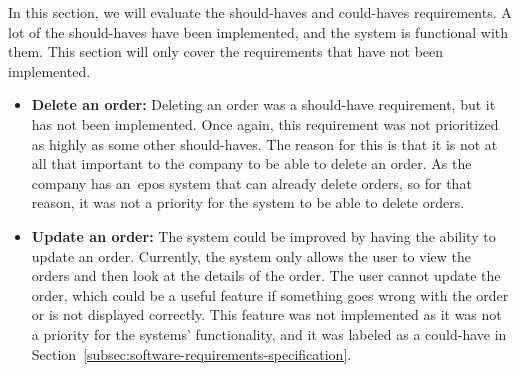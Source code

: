 In this section, we will evaluate the should-haves and could-haves requirements.
A lot of the should-haves have been implemented, and the system is functional with them.
This section will only cover the requirements that have not been implemented.

\begin{itemize}
    \item \textbf{Delete an order:}
    Deleting an order was a should-have requirement, but it has not been implemented.
    Once again, this requirement was not prioritized as highly as some other should-haves.
    The reason for this is that it is not at all that important to the company to be able to delete an order.
    As the company has an~\acrshort{epos} system that can already delete orders, so for that reason, it was not a priority
    for the system to be able to delete orders.
    \item \textbf{Update an order:}
    The system could be improved by having the ability to update an order.
    Currently, the system only allows the user to view the orders and then look at the details of the order.
    The user cannot update the order, which could be a useful feature if something goes wrong with the order or is not
    displayed correctly.
    This feature was not implemented as it was not a priority for the systems' functionality, and it was labeled as a
    could-have in Section~\ref{subsec:software-requirements-specification}.
\end{itemize}
